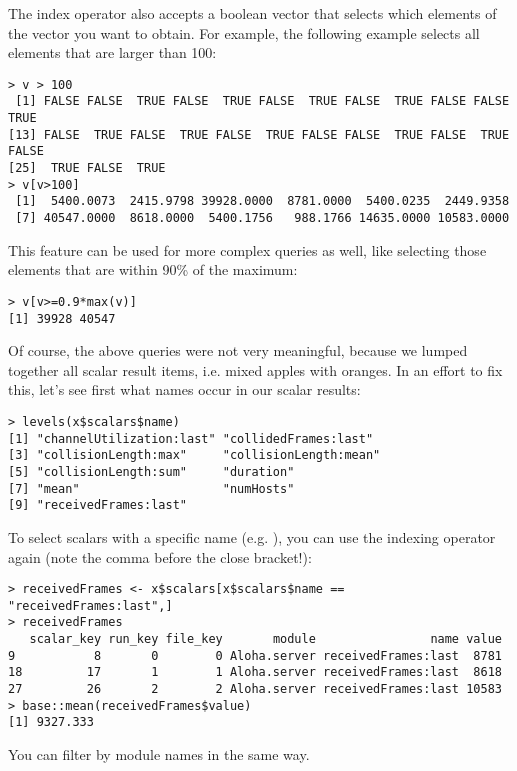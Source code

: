 The index operator also accepts a boolean vector that selects which elements
of the vector you want to obtain. For example, the following example selects
all elements that are larger than 100:

\begin{verbatim}
> v > 100
 [1] FALSE FALSE  TRUE FALSE  TRUE FALSE  TRUE FALSE  TRUE FALSE FALSE  TRUE
[13] FALSE  TRUE FALSE  TRUE FALSE  TRUE FALSE FALSE  TRUE FALSE  TRUE FALSE
[25]  TRUE FALSE  TRUE
> v[v>100]
 [1]  5400.0073  2415.9798 39928.0000  8781.0000  5400.0235  2449.9358
 [7] 40547.0000  8618.0000  5400.1756   988.1766 14635.0000 10583.0000
\end{verbatim}

This feature can be used for more complex queries as well, like selecting those
elements that are within 90\% of the maximum:

\begin{verbatim}
> v[v>=0.9*max(v)]
[1] 39928 40547
\end{verbatim}

Of course, the above queries were not very meaningful, because we lumped together
all scalar result items, i.e. mixed apples with oranges. In an effort to fix this,
let's see first what names occur in our scalar results:

\begin{verbatim}
> levels(x$scalars$name)
[1] "channelUtilization:last" "collidedFrames:last"    
[3] "collisionLength:max"     "collisionLength:mean"   
[5] "collisionLength:sum"     "duration"               
[7] "mean"                    "numHosts"               
[9] "receivedFrames:last"    
\end{verbatim}

To select scalars with a specific name (e.g. ), you can use the
indexing operator again (note the comma before the close bracket!):

\begin{verbatim}
> receivedFrames <- x$scalars[x$scalars$name == "receivedFrames:last",]
> receivedFrames
   scalar_key run_key file_key       module                name value
9           8       0        0 Aloha.server receivedFrames:last  8781
18         17       1        1 Aloha.server receivedFrames:last  8618
27         26       2        2 Aloha.server receivedFrames:last 10583
> base::mean(receivedFrames$value)
[1] 9327.333
\end{verbatim}

You can filter by module names in the same way.

